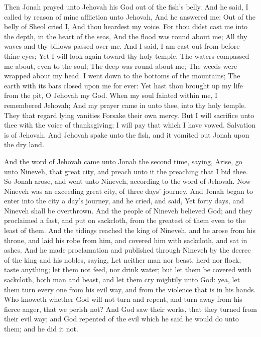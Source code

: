 Then Jonah prayed unto Jehovah his God out of the fish’s belly. And he said, I called by reason of mine affliction unto Jehovah, And he answered me; Out of the belly of Sheol cried I, And thou heardest my voice.  For thou didst cast me into the depth, in the heart of the seas, And the flood was round about me; All thy waves and thy billows passed over me.  And I said, I am cast out from before thine eyes; Yet I will look again toward thy holy temple.  The waters compassed me about, even to the soul; The deep was round about me; The weeds were wrapped about my head.  I went down to the bottoms of the mountains; The earth with its bars closed upon me for ever: Yet hast thou brought up my life from the pit, O Jehovah my God.  When my soul fainted within me, I remembered Jehovah; And my prayer came in unto thee, into thy holy temple.  They that regard lying vanities Forsake their own mercy.  But I will sacrifice unto thee with the voice of thanksgiving; I will pay that which I have vowed. Salvation is of Jehovah.  And Jehovah spake unto the fish, and it vomited out Jonah upon the dry land. 

And the word of Jehovah came unto Jonah the second time, saying, Arise, go unto Nineveh, that great city, and preach unto it the preaching that I bid thee. So Jonah arose, and went unto Nineveh, according to the word of Jehovah. Now Nineveh was an exceeding great city, of three days’ journey. And Jonah began to enter into the city a day’s journey, and he cried, and said, Yet forty days, and Nineveh shall be overthrown.  And the people of Nineveh believed God; and they proclaimed a fast, and put on sackcloth, from the greatest of them even to the least of them. And the tidings reached the king of Nineveh, and he arose from his throne, and laid his robe from him, and covered him with sackcloth, and sat in ashes. And he made proclamation and published through Nineveh by the decree of the king and his nobles, saying, Let neither man nor beast, herd nor flock, taste anything; let them not feed, nor drink water; but let them be covered with sackcloth, both man and beast, and let them cry mightily unto God: yea, let them turn every one from his evil way, and from the violence that is in his hands. Who knoweth whether God will not turn and repent, and turn away from his fierce anger, that we perish not? And God saw their works, that they turned from their evil way; and God repented of the evil which he said he would do unto them; and he did it not. 


